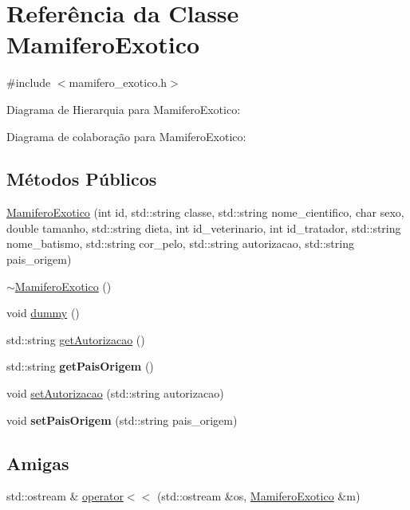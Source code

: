 \hypertarget{classMamiferoExotico}{}\section{Referência da Classe Mamifero\+Exotico}
\label{classMamiferoExotico}


{\ttfamily \#include $<$mamifero\+\_\+exotico.\+h$>$}



Diagrama de Hierarquia para Mamifero\+Exotico\+:


Diagrama de colaboração para Mamifero\+Exotico\+:
\subsection*{Métodos Públicos}
\begin{DoxyCompactItemize}
\item 
\hyperlink{classMamiferoExotico_a8ab63742e80684479f0b573a012f6d27}{Mamifero\+Exotico} (int id, std\+::string classe, std\+::string nome\+\_\+cientifico, char sexo, double tamanho, std\+::string dieta, int id\+\_\+veterinario, int id\+\_\+tratador, std\+::string nome\+\_\+batismo, std\+::string cor\+\_\+pelo, std\+::string autorizacao, std\+::string pais\+\_\+origem)
\item 
\hyperlink{classMamiferoExotico_a2ab6c04adde874cc40aa55b5f586c15a}{$\sim$\+Mamifero\+Exotico} ()
\item 
void \hyperlink{classMamiferoExotico_a0198a13cb62c2400c3a1e9e8a3ddc792}{dummy} ()
\item 
std\+::string \hyperlink{classMamiferoExotico_adfb4f012bfe20e861c86d18305ff79e4}{get\+Autorizacao} ()
\item 
\mbox{\label{classMamiferoExotico_a26c51b857c58c1469318d2d2638b3f22}} 
std\+::string {\bfseries get\+Pais\+Origem} ()
\item 
void \hyperlink{classMamiferoExotico_a8d6e213728fc09f524885350212dffa8}{set\+Autorizacao} (std\+::string autorizacao)
\item 
\mbox{\label{classMamiferoExotico_a12beb43997f4c0b554d0002ba2f8000b}} 
void {\bfseries set\+Pais\+Origem} (std\+::string pais\+\_\+origem)
\end{DoxyCompactItemize}
\subsection*{Amigas}
\begin{DoxyCompactItemize}
\item 
std\+::ostream \& \hyperlink{classMamiferoExotico_a231b2c30dd191f7b75c98f75e40f1ddb}{operator$<$$<$} (std\+::ostream \&os, \hyperlink{classMamiferoExotico}{Mamifero\+Exotico} \&m)
\end{DoxyCompactItemize}
